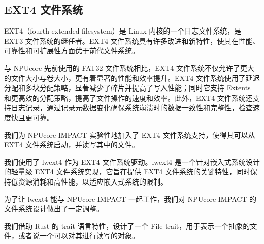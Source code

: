\subsection{EXT4 文件系统}

EXT4（fourth extended filesystem）是 Linux 内核的一个日志文件系统，是 EXT3 文件系统的继任者。EXT4 文件系统具有许多改进和新特性，使其在性能、可靠性和可扩展性方面优于前代文件系统。

与 NPUcore 先前使用的 FAT32 文件系统相比，EXT4 文件系统不仅允许了更大的文件大小与卷大小，更有着显著的性能和效率提升。EXT4 文件系统使用了延迟分配和多块分配策略，显著减少了碎片并提高了写入性能；同时它支持 Extents 和更高效的分配策略，提高了文件操作的速度和效率。此外，EXT4 文件系统还支持日志记录，通过记录元数据变化确保系统崩溃时的数据一致性和完整性，检查速度快且更可靠。

我们为 NPUcore-IMPACT 实验性地加入了 EXT4 文件系统支持，使得其可以从 EXT4 文件系统启动，并读写其中的文件。

我们使用了 lwext4 作为 EXT4 文件系统驱动。lwext4 是一个针对嵌入式系统设计的轻量级 EXT4 文件系统实现，它旨在提供 EXT4 文件系统的关键特性，同时保持低资源消耗和高性能，以适应嵌入式系统的限制。

为了让 lwext4 能与 NPUcore-IMPACT 一起工作，我们对 NPUcore-IMPACT 的文件系统设计做出了一定调整。

我们借助 Rust 的 trait 语言特性，设计了一个 File trait，用于表示一个抽象的文件，或者说一个可以对其进行读写的对象。

